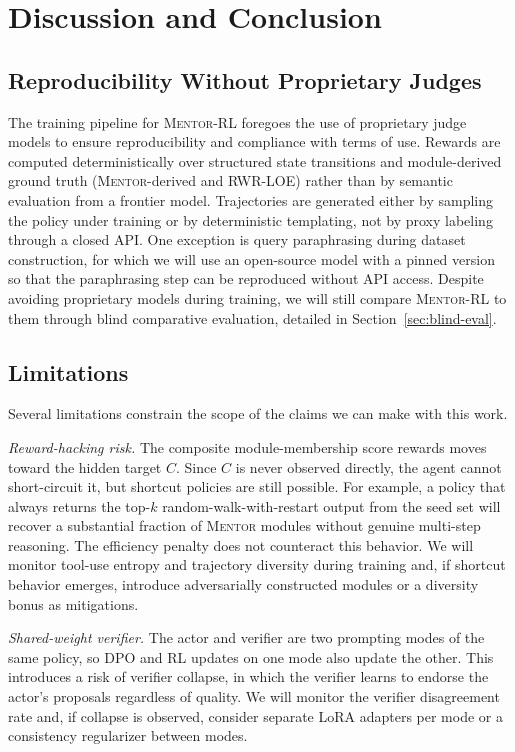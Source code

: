 \documentclass[thesis,letterpaper,12pt]{utthesis}
\begin{document}
\section{Discussion and Conclusion}

\subsection{Reproducibility Without Proprietary Judges}
The training pipeline for \textsc{Mentor-RL} foregoes the use of proprietary judge models to ensure reproducibility and compliance with terms of use. Rewards are computed deterministically over structured state transitions and module-derived ground truth (\textsc{Mentor}-derived and RWR-LOE) rather than by semantic evaluation from a frontier model. Trajectories are generated either by sampling the policy under training or by deterministic templating, not by proxy labeling through a closed API. One exception is query paraphrasing during dataset construction, for which we will use an open-source model with a pinned version so that the paraphrasing step can be reproduced without API access. Despite avoiding proprietary models during training, we will still compare \textsc{Mentor-RL} to them through blind comparative evaluation, detailed in Section~\ref{sec:blind-eval}.

\subsection{Limitations}\label{sec:limitations}
Several limitations constrain the scope of the claims we can make with this work.

\textit{Reward-hacking risk.} The composite module-membership score rewards moves toward the hidden target $C$. Since $C$ is never observed directly, the agent cannot short-circuit it, but shortcut policies are still possible. For example, a policy that always returns the top-$k$ random-walk-with-restart output from the seed set will recover a substantial fraction of \textsc{Mentor} modules without genuine multi-step reasoning. The efficiency penalty does not counteract this behavior. We will monitor tool-use entropy and trajectory diversity during training and, if shortcut behavior emerges, introduce adversarially constructed modules or a diversity bonus as mitigations.

\textit{Shared-weight verifier.} The actor and verifier are two prompting modes of the same policy, so DPO and RL updates on one mode also update the other. This introduces a risk of verifier collapse, in which the verifier learns to endorse the actor's proposals regardless of quality. We will monitor the verifier disagreement rate and, if collapse is observed, consider separate LoRA adapters per mode or a consistency regularizer between modes.
\end{document}
